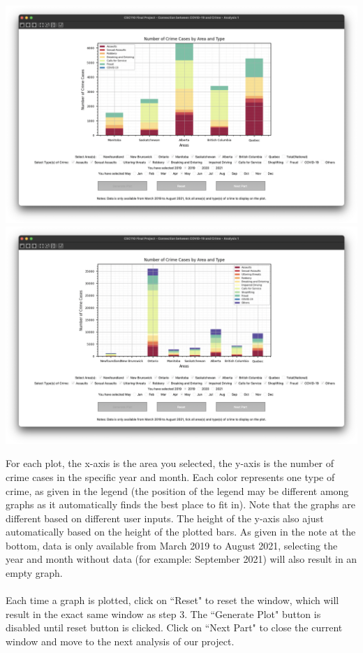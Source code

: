 \documentclass[fontsize=11pt]{article}
\begin{document}
\begin{enumerate}
  \includegraphics[scale=0.15]{screenshot2.png} \includegraphics[scale=0.15]{screenshot3.png} 
  
  For each plot, the x-axis is the area you selected, the y-axis is the number of crime cases in the specific year and month. Each color represents one type of crime, as given in the legend (the position of the legend may be different among graphs as it automatically finds the best place to fit in). Note that the graphs are different based on different user inputs. The height of the y-axis also ajust automatically based on the height of the plotted bars. As given in the note at the bottom, data is only available from March 2019 to August 2021, selecting the year and month without data (for example: September 2021) will also result in an empty graph.
  \\
  \\
  Each time a graph is plotted, click on ``Reset" to reset the window, which will result in the exact same window as step 3. The ``Generate Plot" button is disabled until reset button is clicked. Click on ``Next Part" to close the current window and move to the next analysis of our project.
  

\end{enumerate}
\end{document}
